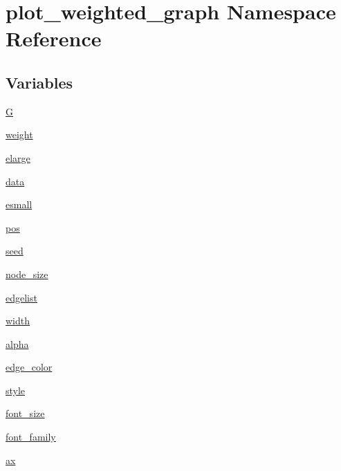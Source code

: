 \hypertarget{namespaceplot__weighted__graph}{}\section{plot\+\_\+weighted\+\_\+graph Namespace Reference}
\label{namespaceplot__weighted__graph}
\subsection*{Variables}
\begin{DoxyCompactItemize}
\item 
\hyperlink{namespaceplot__weighted__graph_a6c3c132fae5c2bb49c18de5f474a5aaf}{G}
\item 
\hyperlink{namespaceplot__weighted__graph_a11e694ac04d63a9b049a4991fdab2b08}{weight}
\item 
\hyperlink{namespaceplot__weighted__graph_ad4998884d88a24994520946299697869}{elarge}
\item 
\hyperlink{namespaceplot__weighted__graph_abdf8324c8a87820c5ce555bb61af2bd1}{data}
\item 
\hyperlink{namespaceplot__weighted__graph_aea42402e6fb3a9338be8b01fb95f0e09}{esmall}
\item 
\hyperlink{namespaceplot__weighted__graph_a048d95be222fe0467f8022d2f5f177e4}{pos}
\item 
\hyperlink{namespaceplot__weighted__graph_a2ab11b6d3e37786a5b417388d2d8fe0e}{seed}
\item 
\hyperlink{namespaceplot__weighted__graph_a4c1e247e921c8121b44e527b2d825fbf}{node\+\_\+size}
\item 
\hyperlink{namespaceplot__weighted__graph_ac3328c2ac420fd00bbd6b70aa359f3a4}{edgelist}
\item 
\hyperlink{namespaceplot__weighted__graph_a0bcc9adaafb4d28fcb41cfa40ed1c1de}{width}
\item 
\hyperlink{namespaceplot__weighted__graph_a949f0d1fcb1bf1e272157ae0681cfa4e}{alpha}
\item 
\hyperlink{namespaceplot__weighted__graph_a7b502c2ad29af2e97ba6a2c884b4f562}{edge\+\_\+color}
\item 
\hyperlink{namespaceplot__weighted__graph_aa77f85b55e45f6c10accd7df07a55d4f}{style}
\item 
\hyperlink{namespaceplot__weighted__graph_abd36aa8f5e4f8464ace8f20cdca973f7}{font\+\_\+size}
\item 
\hyperlink{namespaceplot__weighted__graph_a0148c9be8062c72c43a90fdad4065621}{font\+\_\+family}
\item 
\hyperlink{namespaceplot__weighted__graph_a1f6b54265bddcb3250f5e476b853ab59}{ax}
\end{DoxyCompactItemize}


